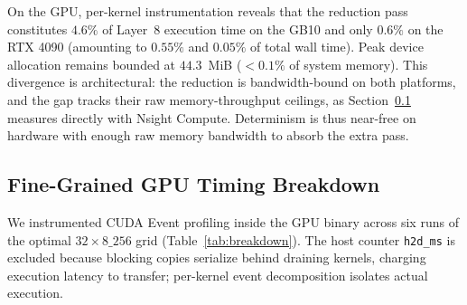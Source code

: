 \documentclass[conference]{IEEEtran}
\begin{document}
On the GPU, per-kernel instrumentation reveals that the reduction pass constitutes $4.6\%$ of Layer~8 execution time on the GB10 and only $0.6\%$ on the RTX 4090 (amounting to $0.55\%$ and $0.05\%$ of total wall time). Peak device allocation remains bounded at $44.3$~MiB ($<0.1\%$ of system memory). This divergence is architectural: the reduction is bandwidth-bound on both platforms, and the gap tracks their raw memory-throughput ceilings, as Section~\ref{sec:breakdown} measures directly with Nsight Compute. Determinism is thus near-free on hardware with enough raw memory bandwidth to absorb the extra pass.

\subsection{Fine-Grained GPU Timing Breakdown}
\label{sec:breakdown}
We instrumented CUDA Event profiling inside the GPU binary across six runs of the optimal $32{\times}8\_256$ grid (Table~\ref{tab:breakdown}). The host counter \texttt{h2d\_ms} is excluded because blocking copies serialize behind draining kernels, charging execution latency to transfer; per-kernel event decomposition isolates actual execution.
\end{document}
